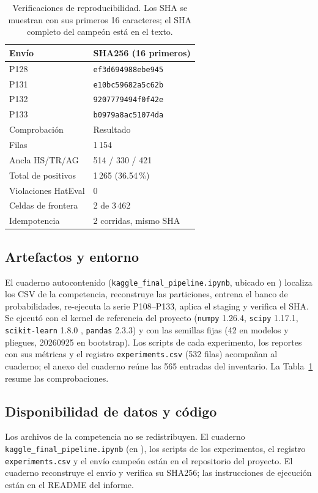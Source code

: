 \begin{table}[t]
\centering
\caption{Verificaciones de reproducibilidad. Los SHA se muestran con sus
primeros 16 caracteres; el SHA completo del campeón está en el texto.}
\label{tab:repro}
\small
\begin{tabular}{ll}
\toprule
Envío & SHA256 (16 primeros) \\
\midrule
P128 & \texttt{ef3d694988ebe945} \\
P131 & \texttt{e10bc59682a5c62b} \\
P132 & \texttt{9207779494f0f42e} \\
P133 & \texttt{b0979a8ac51074da} \\
\midrule
Comprobación & Resultado \\
\midrule
Filas & 1\,154 \\
Ancla HS/TR/AG & 514 / 330 / 421 \\
Total de positivos & 1\,265 (36.54\,\%) \\
Violaciones HatEval & 0 \\
Celdas de frontera & 2 de 3\,462 \\
Idempotencia & 2 corridas, mismo SHA \\
\bottomrule
\end{tabular}
\end{table}

\subsection{Artefactos y entorno}

El cuaderno autocontenido (\texttt{kaggle\_}\allowbreak\texttt{final\_}\allowbreak\texttt{pipeline.ipynb},
ubicado en ) localiza los CSV de la competencia, reconstruye las particiones, entrena el
banco de probabilidades, re-ejecuta la serie P108--P133, aplica el staging y
verifica el SHA. Se ejecutó con el kernel de referencia del proyecto
(\texttt{numpy} 1.26.4, \texttt{scipy} 1.17.1, \texttt{scikit-learn} 1.8.0
\cite{pedregosa2011scikit}, \texttt{pandas} 2.3.3) y con las semillas fijas (42 en modelos y pliegues,
20260925 en bootstrap). Los scripts de cada experimento, los reportes con sus
métricas y el registro \texttt{experiments.csv} (532 filas) acompañan al
cuaderno; el anexo del cuaderno reúne las 565 entradas del inventario. La
Tabla~\ref{tab:repro} resume las comprobaciones.

\subsection{Disponibilidad de datos y código}
Los archivos de la competencia no se redistribuyen. El cuaderno
\texttt{kaggle\_}\allowbreak\texttt{final\_}\allowbreak\texttt{pipeline.ipynb}
(en ), los scripts de los experimentos,
el registro \texttt{experiments.csv} y el envío campeón están en el repositorio
del proyecto. El cuaderno reconstruye el envío y verifica su SHA256; las
instrucciones de ejecución están en el README del informe.
